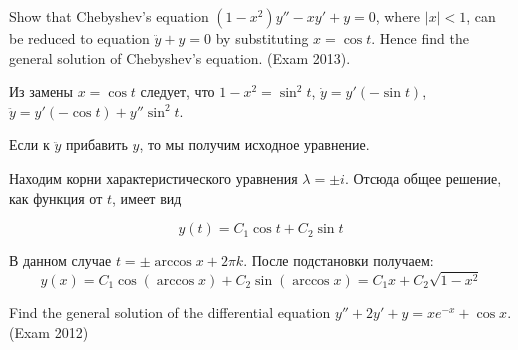 \begin{problem}
Show that Chebyshev's equation $(1-x^{2} )y''-xy'+y=0$, where $\left|x\right|<1$, can be reduced to equation $\ddot{y}+y=0$ by substituting $x=\cos t$. Hence find the general solution of  Chebyshev's equation. (Exam 2013).
\end{problem}

\begin{solution}
Из замены $x=\cos t$ следует, что $1-x^2=\sin^2 t$, $\dot{y}=y'(-\sin t)$, $\ddot{y}=y'(-\cos t )+y'' \sin^2 t$. 

Если к $\ddot{y}$ прибавить $y$, то мы получим исходное уравнение.

Находим корни характеристического уравнения $\lambda=\pm i$. Отсюда общее решение, как функция от $t$, имеет вид

\[
y(t)=C_1 \cos t + C_2 \sin t
\]

В данном случае $t=\pm \arccos x + 2\pi k$. После подстановки получаем:
\[
y(x)=C_1 \cos(\arccos x) + C_2 \sin (\arccos x)= C_1 x + C_2 \sqrt{1-x^2}
\]
\end{solution}






\begin{problem}
Find the general solution of the differential equation $y''+2y'+y=xe^{-x} +\cos x$. (Exam 2012)
\end{problem}


